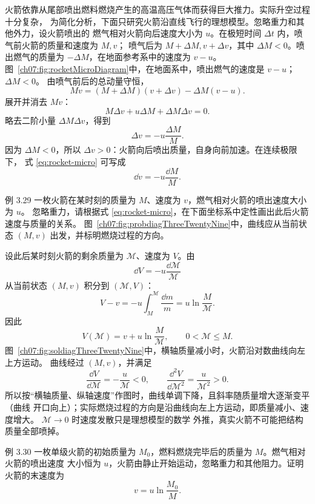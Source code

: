 火箭依靠从尾部喷出燃料燃烧产生的高温高压气体而获得巨大推力。实际升空过程十分复杂，
为简化分析，下面只研究火箭沿直线飞行的理想模型。忽略重力和其他外力，设火箭喷出的
燃气相对火箭向后速度大小为 $u$。在极短时间 $\Delta t$ 内，喷气前火箭的质量和速度为 $M,v$；
喷气后为 $M+\Delta M,v+\Delta v$，其中 $\Delta M<0$。喷出燃气的质量为
$-\Delta M$，在地面参考系中的速度为 $v-u$。
图~\ref{ch07:fig:rocketMicroDiagram}中，在地面系中，喷出燃气的速度是 $v-u$；$\Delta M<0$。
\rocketMicroDiagram
由喷气前后的总动量守恒，
\[
 Mv=(M+\Delta M)(v+\Delta v)-\Delta M(v-u).
\]
展开并消去 $Mv$：
\[
 M\Delta v+u\Delta M+\Delta M\Delta v=0.
\]
略去二阶小量 $\Delta M\Delta v$，得到
\begin{equation}
 \label{eq:rocket-micro}
 \Delta v=-u\frac{\Delta M}{M}.
\end{equation}
因为 $\Delta M<0$，所以 $\Delta v>0$：火箭向后喷出质量，自身向前加速。在连续极限下，
式 \eqref{eq:rocket-micro} 可写成
\[
 \dd v=-u\frac{\dd M}{M}.
\]

\Needspace{0.34\textheight}
\begin{origexamplebox}{例 3.29}
一枚火箭在某时刻的质量为 $M$、速度为 $v$，燃气相对火箭的喷出速度大小为 $u$。
忽略重力，请根据式 \eqref{eq:rocket-micro}，在下面坐标系中定性画出此后火箭速度与质量的关系。
图~\ref{ch07:fig:probdiagThreeTwentyNine}中，曲线应从当前状态 $(M,v)$ 出发，并标明燃烧过程的方向。
\probdiagThreeTwentyNine
\end{origexamplebox}

\begin{xesolution}
设此后某时刻火箭的剩余质量为 $\mathcal M$、速度为 $V$。由
\[
 \dd V=-u\frac{\dd\mathcal M}{\mathcal M}
\]
从当前状态 $(M,v)$ 积分到 $(\mathcal M,V)$：
\[
 V-v=-u\int_M^{\mathcal M}\frac{\dd m}{m}
 =u\ln\frac{M}{\mathcal M}.
\]
因此
\[
 \boxed{V(\mathcal M)=v+u\ln\frac{M}{\mathcal M}},
 \qquad 0<\mathcal M\le M.
\]
图~\ref{ch07:fig:soldiagThreeTwentyNine}中，横轴质量减小时，火箭沿对数曲线向左上方运动。
\soldiagThreeTwentyNine
曲线经过 $(M,v)$，并满足
\[
 \frac{\dd V}{\dd\mathcal M}=-\frac{u}{\mathcal M}<0,
 \qquad
 \frac{\dd^2V}{\dd\mathcal M^2}
 =\frac{u}{\mathcal M^2}>0.
\]
所以按“横轴质量、纵轴速度”作图时，曲线单调下降，且斜率随质量增大逐渐变平（曲线
开口向上）；实际燃烧过程的方向是沿曲线向左上方运动，即质量减小、速度增大。
$\mathcal M\to0$ 时速度发散只是理想模型的数学
外推，真实火箭不可能把结构质量全部喷掉。
\end{xesolution}

\Needspace{0.30\textheight}
\begin{origexamplebox}{例 3.30}
一枚单级火箭的初始质量为 $M_0$，燃料燃烧完毕后的质量为 $M$。燃气相对火箭的喷出速度
大小恒为 $u$，火箭由静止开始运动，忽略重力和其他阻力。证明火箭的末速度为
\[
 v=u\ln\frac{M_0}{M}.
\]
\end{origexamplebox}

